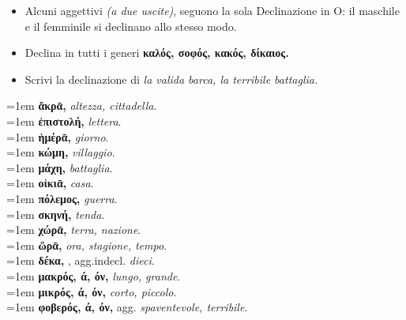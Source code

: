 \documentclass[nols]{tufte-handout}
\newcommand{\textls}[2][5]{%
    \begingroup\addfontfeatures{LetterSpace=#1}#2\endgroup
  }
\renewcommand{\smallcapsspacing}[1]{\textls[10]{#1}}
\renewcommand{\textsc}[1]{\smallcapsspacing{\textsmallcaps{#1}}}
\begin{document}
\begin{itemize}
\item[\textsc{1.}] Alcuni aggettivi \textit{(a due uscite)}, seguono la sola Declinazione in O: il maschile e il femminile si declinano allo stesso modo. 
\end{itemize}

\begin{itemize}
\item[\textsc{1.}] Declina in tutti i generi \textbf{καλός, σοφός, κακός, δίκαιος.}
\item[\textsc{2.}] Scrivi la declinazione di \textit{la valida barca, la terribile battaglia.}
\end{itemize}



\begin{multicols}{2}
    \noindent \hangindent=1em \textbf{ἄκρᾱ,} \textit{altezza, cittadella}.  \\
    \noindent \hangindent=1em \textbf{ἐπιστολή,} \textit{lettera}.  \\
    \noindent \hangindent=1em \textbf{ἡμέρᾱ,} \textit{giorno}.  \\
    \noindent \hangindent=1em \textbf{κώμη,} \textit{villaggio}.  \\
    \noindent \hangindent=1em \textbf{μάχη,} \textit{battaglia}.  \\
    \noindent \hangindent=1em \textbf{οἰκιᾱ,} \textit{casa}.  \\
    \noindent \hangindent=1em \textbf{πόλεμος,} \textit{guerra}.  \\
    \noindent \hangindent=1em \textbf{σκηνή,} \textit{tenda}.  \\
	
    \noindent \hangindent=1em \textbf{χώρᾱ,} \textit{terra, nazione}.  \\
    \noindent \hangindent=1em \textbf{ὥρᾱ,} \textit{ora, stagione, tempo}.  \\
	
	\noindent \hangindent=1em \textbf{δέκα,} , agg.indecl. \textit{dieci}. \\ 
	
	
    \noindent \hangindent=1em \textbf{μακρός, ά, όν,} \textit{lungo, grande}.  \\
	\noindent \hangindent=1em \textbf{μικρός, ά, όν,} \textit{corto, piccolo}.  \\
	\noindent \hangindent=1em \textbf{φοβερός, ά, όν,} agg. \textit{spaventevole, terribile}.  \\
\end{multicols}
\end{document}
